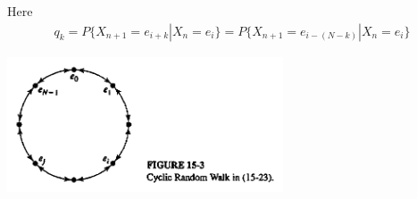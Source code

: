 \documentclass{beamer}
\begin{document}
\begin{frame}

Here
\begin{align}
q_k = P\{X_{n + 1} = e_{i + k}|X_n = e_i\} = P\{X_{n + 1} = e_{i - (N - k)}|X_n = e_i\}
\end{align}

\begin{center}
\includegraphics[height = 4cm]{figs/figure}
\end{center}

\end{frame}
\end{document}
